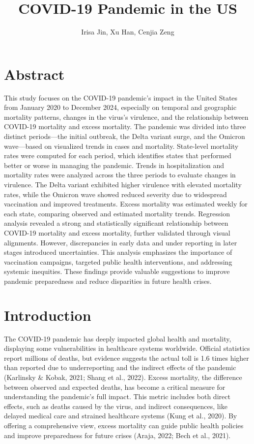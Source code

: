 \documentclass[
  letterpaper,
  DIV=11,
  numbers=noendperiod]{scrartcl}
\title{COVID-19 Pandemic in the US}
\author{Irisa Jin, Xu Han, Cenjia Zeng}
\date{}
\begin{document}
\maketitle


\section{Abstract}\label{abstract}

This study focuses on the COVID-19 pandemic's impact in the United
States from January 2020 to December 2024, especially on temporal and
geographic mortality patterns, changes in the virus's virulence, and the
relationship between COVID-19 mortality and excess mortality. The
pandemic was divided into three distinct periods---the initial outbreak,
the Delta variant surge, and the Omicron wave---based on visualized
trends in cases and mortality. State-level mortality rates were computed
for each period, which identifies states that performed better or worse
in managing the pandemic. Trends in hospitalization and mortality rates
were analyzed across the three periods to evaluate changes in virulence.
The Delta variant exhibited higher virulence with elevated mortality
rates, while the Omicron wave showed reduced severity due to widespread
vaccination and improved treatments. Excess mortality was estimated
weekly for each state, comparing observed and estimated mortality
trends. Regression analysis revealed a strong and statistically
significant relationship between COVID-19 mortality and excess
mortality, further validated through visual alignments. However,
discrepancies in early data and under reporting in later stages
introduced uncertainties. This analysis emphasizes the importance of
vaccination campaigns, targeted public health interventions, and
addressing systemic inequities. These findings provide valuable
suggestions to improve pandemic preparedness and reduce disparities in
future health crises.

\section{Introduction}\label{introduction}

The COVID-19 pandemic has deeply impacted global health and mortality,
displaying some vulnerabilities in healthcare systems worldwide.
Official statistics report millions of deaths, but evidence suggests the
actual toll is 1.6 times higher than reported due to underreporting and
the indirect effects of the pandemic (Karlinsky \& Kobak, 2021; Shang et
al., 2022). Excess mortality, the difference between observed and
expected deaths, has become a critical measure for understanding the
pandemic's full impact. This metric includes both direct effects, such
as deaths caused by the virus, and indirect consequences, like delayed
medical care and strained healthcare systems (Kung et al., 2020). By
offering a comprehensive view, excess mortality can guide public health
policies and improve preparedness for future crises (Araja, 2022; Bech
et al., 2021).
\end{document}
